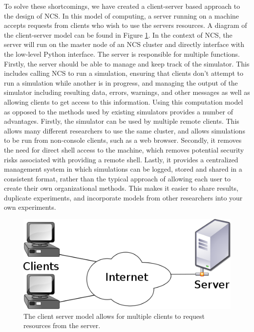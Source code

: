 To solve these shortcomings, we have created a client-server based approach to the design of NCS. In this model of computing, a server running on a machine accepts requests from clients who wish to use the servers resources. A diagram of the client-server model can be found in Figure \ref{fig:client_server}\cite{wiki:clientserver}. In the context of NCS, the server will run on the master node of an NCS cluster and directly interface with the low-level Python interface. The server is responsible for multiple functions. Firstly, the server should be able to manage and keep track of the simulator. This includes calling NCS to run a simulation, ensuring that clients don't attempt to run a simulation while another is in progress, and managing the output of the simulator including resulting data, errors, warnings, and other messages as well as allowing clients to get access to this information. Using this computation model as opposed to the methods used by existing simulators provides a number of advantages. Firstly, the simulator can be used by multiple remote clients. This allows many different researchers to use the same cluster, and allows simulations to be run from non-console clients, such as a web browser. Secondly, it removes the need for direct shell access to the machine, which removes potential security risks associated with providing a remote shell. Lastly, it provides a centralized management system in which simulations can be logged, stored and shared in a consistent format, rather than the typical approach of allowing each user to create their own organizational methods. This makes it easier to share results, duplicate experiments, and incorporate models from other researchers into your own experiments.

\begin{figure}
\begin{center}
\includegraphics[height=\textheight,width=5in,keepaspectratio]{figures/client_server.png}
\caption[Client-Server Model \cite{wiki:clientserver}]{The client server model allows for multiple clients to request resources from the server\cite{wiki:clientserver}.\label{fig:client_server}}
\end{center}
\end{figure}

